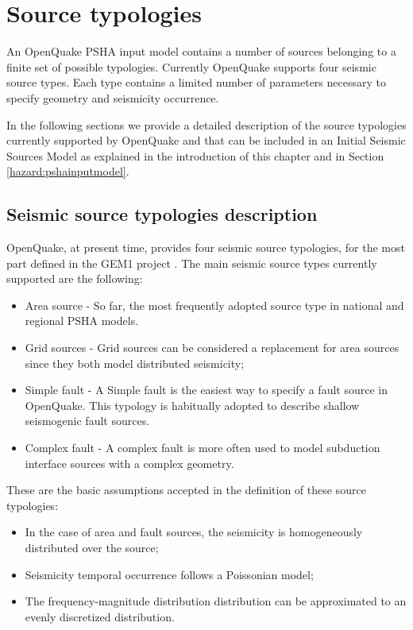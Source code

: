 \section{Source typologies}
An OpenQuake PSHA input model contains a number of sources belonging 
to a finite set of possible typologies. Currently OpenQuake supports 
four seismic source types. Each type contains a limited number of 
parameters necessary to specify geometry and seismicity occurrence. 

In the following sections we provide a detailed description of the 
source typologies currently supported by OpenQuake and that can be 
included in an Initial Seismic Sources Model as explained in the 
introduction of this chapter and in Section \ref{hazard:pshainputmodel}.
%
\subsection{Seismic source typologies description}
\label{sec:seismic_source_descr}
%
OpenQuake, at present time, provides four seismic source typologies, 
for the most part defined in the GEM1 project \citep{pagani2010}. 
%
The main seismic source types currently supported are the following:
\begin{itemize}
\item Area source - So far, the most frequently adopted source 
type in national and regional PSHA models.
\item Grid sources - Grid sources can be considered a replacement 
for area sources since they both model distributed seismicity;
\item Simple fault - A Simple fault is the easiest way to
specify a fault source in OpenQuake. This typology is habitually adopted 
to describe shallow seismogenic fault sources.
\item Complex fault - A complex fault is more often used 
to model subduction interface sources with a complex geometry. 
\end{itemize}

These are the basic assumptions accepted in the definition of these source 
typologies:
\begin{itemize}
\item In the case of area and fault sources, the seismicity is homogeneously 
distributed over the source; 
\item Seismicity temporal occurrence follows a Poissonian model; 
\item The frequency-magnitude distribution distribution can be approximated 
to an evenly discretized distribution. 
\end{itemize}
%
